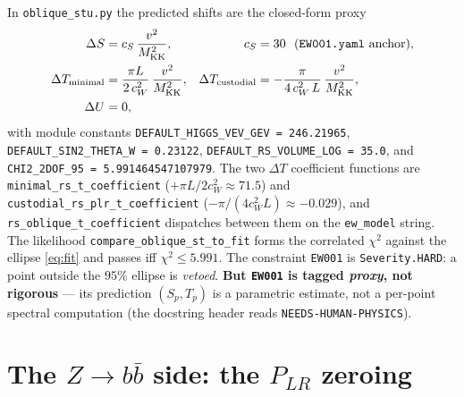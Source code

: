\documentclass[11pt]{article}
\newcommand{\MKK}{M_{\mathrm{KK}}}
\newcommand{\cwsq}{c_W^2}
\newcommand{\vev}{v}
\newcommand{\PLR}{P_{LR}}
\newcommand{\code}[1]{\texttt{#1}}
\theoremstyle{definition}
\begin{document}
In \code{oblique\_stu.py} the predicted shifts are the closed-form proxy
\begin{align}
\Delta S &= c_S\,\frac{\vev^2}{\MKK^2}, & c_S &= 30\ \ (\text{\code{EW001.yaml} anchor}),
\label{eq:codeS}\\
\Delta T_{\rm minimal} &= \frac{\pi L}{2\,\cwsq}\,\frac{\vev^2}{\MKK^2}, &
\Delta T_{\rm custodial} &= -\frac{\pi}{4\,\cwsq\,L}\,\frac{\vev^2}{\MKK^2},
\label{eq:codeT}\\
\Delta U &= 0,
\end{align}
with module constants \code{DEFAULT\_HIGGS\_VEV\_GEV = 246.21965},
\code{DEFAULT\_SIN2\_THETA\_W = 0.23122}, \code{DEFAULT\_RS\_VOLUME\_LOG = 35.0},
and \code{CHI2\_2DOF\_95 = 5.991464547107979}. The two $\Delta T$ coefficient
functions are \code{minimal\_rs\_t\_coefficient}
($+\pi L/2\cwsq\approx 71.5$) and \code{custodial\_rs\_plr\_t\_coefficient}
($-\pi/(4\cwsq L)\approx -0.029$), and \code{rs\_oblique\_t\_coefficient}
dispatches between them on the \code{ew\_model} string. The likelihood
\code{compare\_oblique\_st\_to\_fit} forms the correlated $\chi^2$ against the
ellipse \eqref{eq:fit} and passes iff $\chi^2\le 5.991$. The constraint
\code{EW001} is \code{Severity.HARD}: a point outside the $95\%$ ellipse is
\emph{vetoed}. \textbf{But \code{EW001} is tagged \emph{proxy}, not rigorous} ---
its prediction $(S_p,T_p)$ is a parametric estimate, not a per-point spectral
computation (the docstring header reads \code{NEEDS-HUMAN-PHYSICS}).

\section{The $Z\to b\bar b$ side: the $\PLR$ zeroing}
\label{sec:codeZbb}
\end{document}

